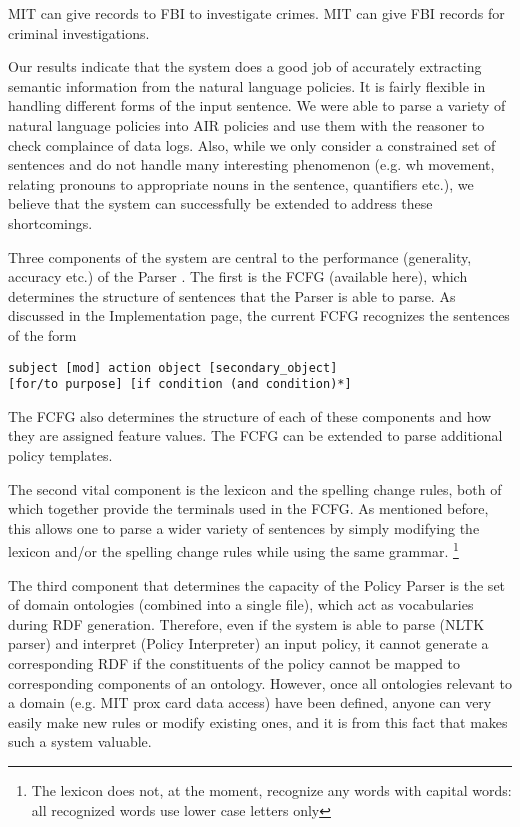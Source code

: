 \documentclass{llncs}
\begin{document}
MIT can give records to FBI to investigate crimes.
MIT can give FBI records for criminal investigations.

Our results indicate that the system does a good job of accurately extracting semantic information from the natural language policies. It is fairly flexible in handling different forms of the input sentence. We were able to parse a variety of natural language policies into AIR policies and use them with the reasoner to check complaince of data logs. Also, while we only consider a constrained set of sentences and do not handle many interesting phenomenon (e.g. wh movement, relating pronouns to appropriate nouns in the sentence, quantifiers etc.), we believe that the system can successfully be extended to address these shortcomings. 

Three components of the system are central to the performance (generality, accuracy etc.) of the Parser . The first is the FCFG (available here), which determines the structure of sentences that the Parser is able to parse. As discussed in the Implementation page, the current FCFG recognizes the sentences of the form

\begin{verbatim}
subject [mod] action object [secondary_object] 
[for/to purpose] [if condition (and condition)*]
\end{verbatim}

The FCFG also determines the structure of each of these components and how they are assigned feature values. The FCFG can be extended to parse additional policy templates.

The second vital component is the lexicon and the spelling change rules, both of which together provide the terminals used in the FCFG. As mentioned before, this allows one to parse a wider variety of sentences by simply modifying the lexicon and/or the spelling change rules while using the same grammar. \footnote{The lexicon does not, at the moment, recognize any words with capital words: all recognized words use lower case letters only}

The third component that determines the capacity of the Policy Parser is the set of domain ontologies (combined into a single file), which act as vocabularies during RDF generation. Therefore, even if the system is able to parse (NLTK parser) and interpret (Policy Interpreter) an input policy, it cannot generate a corresponding RDF if the constituents of the policy cannot be mapped to corresponding components of an ontology. However, once all ontologies relevant to a domain (e.g. MIT prox card data access) have been defined, anyone can very easily make new rules or modify existing ones, and it is from this fact that makes such a system valuable.
\end{document}
